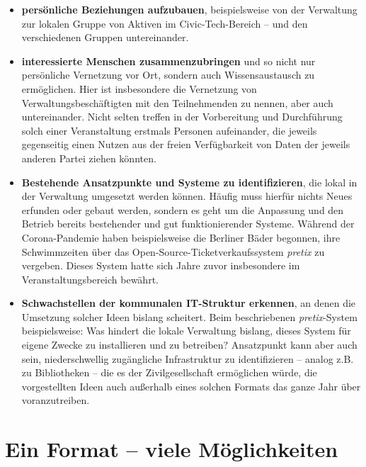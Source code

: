 \begin{itemize}
	\item \textbf{persönliche Beziehungen aufzubauen}, \newline beispielsweise von der Verwaltung zur lokalen Gruppe von Aktiven im Civic-Tech-Bereich – und den verschiedenen Gruppen untereinander. 
	\vspace{0.5cm}
	\item \textbf{interessierte Menschen zusammenzubringen} \newline und so nicht nur persönliche Vernetzung vor Ort, sondern auch Wissensaustausch zu ermöglichen. Hier ist insbesondere die Vernetzung von Verwaltungsbeschäftigten mit den Teilnehmenden zu nennen, aber auch untereinander. Nicht selten treffen in der Vorbereitung und Durchführung solch einer Veranstaltung erstmals Personen aufeinander, die jeweils gegenseitig einen Nutzen aus der freien Verfügbarkeit von Daten der jeweils anderen Partei ziehen könnten.
	\vspace{0.5cm}
	\item \textbf{Bestehende Ansatzpunkte und Systeme zu identifizieren}, \newline die lokal in der Verwaltung umgesetzt werden können. Häufig muss hierfür nichts Neues erfunden oder gebaut werden, sondern es geht um die Anpassung und den Betrieb bereits bestehender und gut funktionierender Systeme. Während der Corona-Pandemie haben beispielsweise die Berliner Bäder begonnen, ihre Schwimmzeiten über das Open-Source-Ti\-cket\-verkauf\-ssystem \textit{pretix} zu vergeben. Dieses System hatte sich Jahre zuvor insbesondere im Veranstaltungsbereich bewährt.
	\vspace{0.5cm}
	\item \textbf{Schwachstellen der kommunalen IT-Struktur erkennen}, \newline an denen die Umsetzung solcher Ideen bislang scheitert. Beim beschriebenen \textit{pretix}-System beispielsweise: Was hindert die lokale Verwaltung bislang, dieses System für eigene Zwecke zu installieren und zu betreiben? Ansatzpunkt kann aber auch sein, niederschwellig zugängliche Infrastruktur zu identifizieren – analog z.B. zu Bibliotheken – die es der Zivilgesellschaft ermöglichen würde, die vorgestellten Ideen auch außerhalb eines solchen Formats das ganze Jahr über voranzutreiben.
\end{itemize}


\section*{Ein Format – viele Möglichkeiten}

